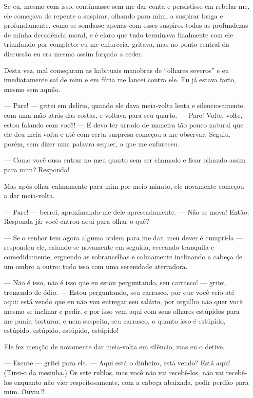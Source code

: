Se eu, mesmo com isso, continuasse sem me dar conta e persistisse em
rebelar-me, ele começava de repente a suspirar, olhando para mim, a
suspirar longa e profundamente, como se sondasse apenas com esses
suspiros todas as profundezas de minha decadência moral, e é claro que
tudo terminava finalmente com ele triunfando por completo: eu me
enfurecia, gritava, mas no ponto central da discussão eu era mesmo
assim forçado a ceder.

Desta vez, mal começaram as habituais manobras de “olhares severos” e eu
imediatamente saí de mim e em fúria me lancei contra ele. Eu já estava
farto, mesmo sem aquilo.

--- Pare! --- gritei em delírio, quando ele dava meia-volta lenta e
silenciosamente, com uma mão atrás das costas, e voltava para seu
quarto. --- Pare! Volte, volte, estou falando com você! --- E devo ter
urrado de maneira tão pouco natural que ele deu meia-volta e até com
certa surpresa começou a me observar. Seguiu, porém, sem dizer uma
palavra sequer, o que me enfureceu.

--- Como você ousa entrar no meu quarto sem ser chamado e ficar olhando
assim para mim? Responda!

Mas após olhar calmamente para mim por meio minuto, ele novamente
começou a dar meia-volta.

--- Pare! --- berrei, aproximando-me dele apressadamente. --- Não se mova!
Então. Responda já: você entrou aqui para olhar o quê?

--- Se o senhor tem agora alguma ordem para me dar, meu dever é cumpri-la
--- respondeu ele, calando-se novamente em seguida, ceceando tranquila e
comedidamente, erguendo as sobrancelhas e calmamente inclinando a
cabeça de um ombro a outro: tudo isso com uma serenidade aterradora.

--- Não é isso, não é isso que eu estou perguntando, seu carrasco! ---
gritei, tremendo de ódio. --- Estou perguntando, seu carrasco, por que
você veio até aqui: está vendo que eu não vou entregar seu salário, por
orgulho não quer você mesmo se inclinar e pedir, e por isso vem aqui
com seus olhares estúpidos para me punir, torturar, e nem suspeita,
seu carrasco, o quanto isso é estúpido, estúpido, estúpido, estúpido,
estúpido!

Ele fez menção de novamente dar meia-volta em silêncio, mas eu o detive.

--- Escute --- gritei para ele. --- Aqui está o dinheiro, está vendo? Está
aqui! (Tirei-o da mesinha.) Os sete rublos, mas você não vai
recebê-los, não vai recebê-los enquanto não vier respeitosamente, com
a cabeça abaixada, pedir perdão para mim. Ouviu?!

